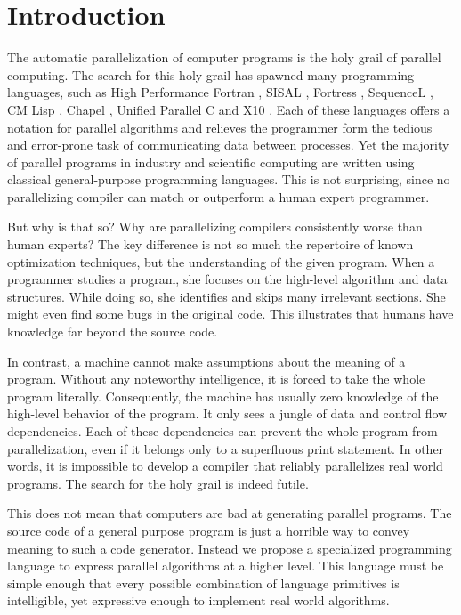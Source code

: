 \section{Introduction}
\label{sec:introduction}

The automatic parallelization of computer programs is the holy grail of
parallel computing. The search for this holy grail has spawned many
programming languages, such as High Performance Fortran \cite{HPF}, SISAL
\cite{SISAL}, Fortress \cite{Fortress}, SequenceL \cite{SequenceL}, CM Lisp
\cite{CM-Lisp}, Chapel \cite{Chapel}, Unified Parallel C \cite{UPC} and X10
\cite{X10}. Each of these languages offers a notation for parallel
algorithms and relieves the programmer form the tedious and error-prone
task of communicating data between processes. Yet the majority of parallel
programs in industry and scientific computing are written using classical
general-purpose programming languages. This is not surprising, since no
parallelizing compiler can match or outperform a human expert programmer.

But why is that so? Why are parallelizing compilers consistently worse than
human experts? The key difference is not so much the repertoire of known
optimization techniques, but the understanding of the given program. When a
programmer studies a program, she focuses on the high-level algorithm and
data structures. While doing so, she identifies and skips many irrelevant
sections. She might even find some bugs in the original code. This
illustrates that humans have knowledge far beyond the source code.

In contrast, a machine cannot make assumptions about the meaning of a
program. Without any noteworthy intelligence, it is forced to take the
whole program literally. Consequently, the machine has usually zero
knowledge of the high-level behavior of the program. It only sees a jungle
of data and control flow dependencies. Each of these dependencies can
prevent the whole program from parallelization, even if it belongs only to
a superfluous print statement. In other words, it is impossible to develop
a compiler that reliably parallelizes real world programs. The search for
the holy grail is indeed futile.

This does not mean that computers are bad at generating parallel
programs. The source code of a general purpose program is just a horrible
way to convey meaning to such a code generator. Instead we propose a
specialized programming language to express parallel algorithms at a higher
level. This language must be simple enough that every possible combination
of language primitives is intelligible, yet expressive enough to implement
real world algorithms.

